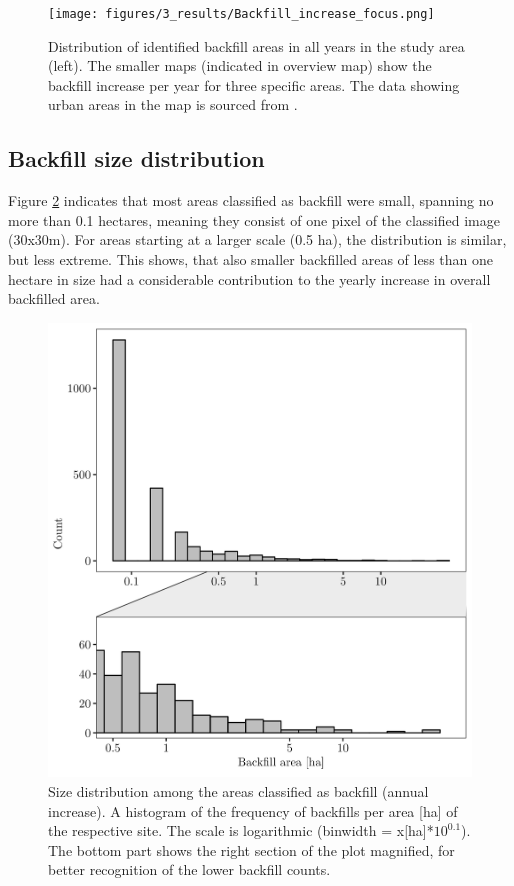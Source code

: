 \documentclass[11pt, A4, oneside]{report}
\begin{document}
\begin{rotatepage}
\begin{landscape}
\begin{figure}[H]
\texttt{[image: figures/3\_results/Backfill\_increase\_focus.png]}
\caption{Distribution of identified backfill areas in all years in the study area (left). The smaller maps (indicated  in overview map) show the backfill increase per year for three specific areas. The data showing urban areas in the map is sourced from \citet{Dupuy.2019}.}
\label{fig:backfill focus area map}
\end{figure}
\end{landscape}
\end{rotatepage}

\subsection{Backfill size distribution}
Figure \ref{fig:BFtypo} indicates that most areas classified as backfill were small, spanning no more than 0.1 hectares, meaning they consist of one pixel of the classified image (30x30m). For areas starting at a larger scale (0.5 ha), the distribution is similar, but less extreme. This shows, that also smaller backfilled areas of less than one hectare in size had a considerable contribution to the yearly increase in overall backfilled area. 

\begin{figure}[H]
\includegraphics[width = 14cm]{figures/3_results/Backfill typology sizes_hm.png}
\caption{Size distribution among the areas classified as backfill (annual increase). A histogram of the frequency of backfills per area [ha] of the respective site. The scale is logarithmic (binwidth = x[ha]*$10^{0.1}$). The bottom part shows the right section of the plot magnified, for better recognition of the lower backfill counts.}
\label{fig:BFtypo}
\end{figure}
\end{document}
